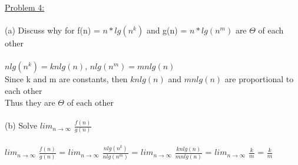 \documentclass{article}
\begin{document}
    \underline{Problem 4:}\\\\
    (a) Discuss why for f(n) = $n*lg(n^k)$ and g(n) = $n*lg(n^m)$ are $\Theta$ of each other\\
    \\
    \indent $nlg(n^k) = knlg(n)$, $nlg(n^m) = mnlg(n)$\\
    \indent Since k and m are constants, then $knlg(n)$ and $mnlg(n)$ are proportional to each other\\
    \indent Thus they are $\Theta$ of each other\\
    \\
    (b) Solve $lim_{n\rightarrow\infty}$ $\frac{f(n)}{g(n)}$\\
    \\
    \indent $lim_{n\rightarrow\infty}$ $\frac{f(n)}{g(n)}$ = $lim_{n\rightarrow\infty}$ $\frac{nlg(n^k)}{nlg(n^m)}$ = $lim_{n\rightarrow\infty}$ $\frac{knlg(n)}{mnlg(n)}$ = $lim_{n\rightarrow\infty}$ $\frac{k}{m}$ = $\frac{k}{m}$\\
    \\
\end{document}
